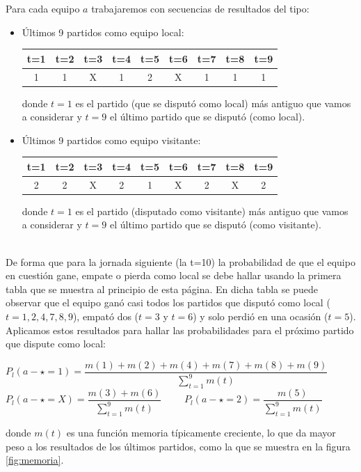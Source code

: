 Para cada equipo $a$ trabajaremos con secuencias de resultados del tipo:
\begin{itemize}
\item Últimos 9 partidos como equipo local:
\begin{center}
	\begin{tabular}{|c|c|c|c|c|c|c|c|c|}
		\hline  t=1 & t=2 & t=3 & t=4 & t=5 & t=6 & t=7 & t=8 & t=9 \\ 
		\hline  1 & 1 & X & 1 & 2 & X & 1 & 1 & 1 \\
		\hline
	\end{tabular} 
\end{center}
donde $t=1$ es el partido (que se disputó como local) más antiguo que vamos a considerar y $t=9$ el último partido que se disputó (como local).
\item Últimos 9 partidos como equipo visitante:
\begin{center}
	\begin{tabular}{|c|c|c|c|c|c|c|c|c|}
		\hline  t=1 & t=2 & t=3 & t=4 & t=5 & t=6 & t=7 & t=8 & t=9 \\ 
		\hline  2 & 2 & X & 2 & 1 & X & 2 & X & 2 \\ 
		\hline
	\end{tabular} 
\end{center}
donde $t=1$ es el partido (disputado como visitante) más antiguo que vamos a considerar y $t=9$ el último partido que se disputó (como visitante).
\end{itemize}
\ \\
De forma que para la jornada siguiente (la t=10) la probabilidad de que el equipo en cuestión gane, empate o pierda como local se debe hallar usando la primera tabla que se muestra al principio de esta página. En dicha tabla se puede observar que el equipo ganó casi todos los partidos que disputó como local ($t=1,2,4,7,8,9$), empató dos ($t=3$ y $t=6$) y solo perdió en una ocasión ($t=5$). Aplicamos estos resultados para hallar las probabilidades para el próximo partido que dispute como local:

\begin{center}
	$P_{l}(a - \star=1)=\dfrac{m(1)+m(2)+m(4)+m(7)+m(8)+m(9)}{\sum_{t=1}^{9}m(t)}$\\
	$P_{l}(a - \star=X)=\dfrac{m(3)+m(6)}{\sum_{t=1}^{9}m(t)}$ \ \ \ \
	$P_{l}(a - \star=2)=\dfrac{m(5)}{\sum_{t=1}^{9}m(t)}$
\end{center}
donde $m(t)$ es una función memoria típicamente creciente, lo que da mayor peso a los resultados de los últimos partidos, como la que se muestra en la figura \ref{fig:memoria}.


